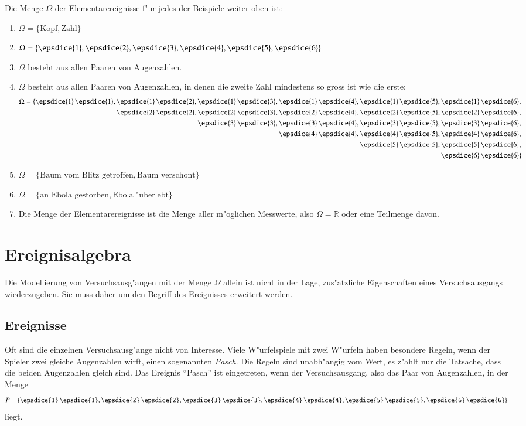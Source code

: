 Die Menge $\Omega$ der Elementarereignisse f"ur jedes der Beispiele weiter
oben ist:
\begin{enumerate}
\item $\Omega=\{\text{Kopf},\text{Zahl}\}$
\item $\Omega=\{\epsdice{1},
\epsdice{2},
\epsdice{3},
\epsdice{4},
\epsdice{5},
\epsdice{6}\}$
\item $\Omega$ besteht aus allen Paaren von Augenzahlen.
\item $\Omega$ besteht aus allen Paaren von Augenzahlen, in denen die
zweite Zahl mindestens so gross ist wie die erste:
{
\def\e#1#2{\epsdice{#1}\,\epsdice{#2}}
\def\p{\phantom{\epsdice{1}\,\epsdice{1},\,}}
\begin{align*}
\Omega=\{
           &\e{1}{1},\e{1}{2},\e{1}{3},\e{1}{4},\e{1}{5},\e{1}{6},\\
           &\p       \e{2}{2},\e{2}{3},\e{2}{4},\e{2}{5},\e{2}{6},\\
           &\p       \p       \e{3}{3},\e{3}{4},\e{3}{5},\e{3}{6},\\
           &\p       \p       \p       \e{4}{4},\e{4}{5},\e{4}{6},\\
           &\p       \p       \p       \p       \e{5}{5},\e{5}{6},\\
           &\p       \p       \p       \p       \p       \e{6}{6}
\}
\end{align*}
}
\item $\Omega=\{\text{Baum vom Blitz getroffen},\text{Baum verschont}\}$
\item $\Omega=\{\text{an Ebola gestorben},\text{Ebola "uberlebt}\}$
\item Die Menge der Elementarereignisse ist die Menge aller m"oglichen
Messwerte, also $\Omega=\mathbb{R}$ oder eine Teilmenge davon.
\end{enumerate}

\section{Ereignisalgebra} \label{section-ereignisse}
Die Modellierung von Versuchsausg"angen mit der Menge $\Omega$
allein ist nicht in der Lage, zus"atzliche Eigenschaften eines
Versuchsausgangs wiederzugeben.
Sie muss daher um den Begriff des Ereignisses erweitert werden.

\subsection{Ereignisse}
Oft sind die einzelnen Versuchsausg"ange nicht von Interesse.
Viele W"urfelspiele mit zwei W"urfeln haben besondere Regeln, wenn
der Spieler zwei gleiche Augenzahlen wirft, einen sogenannten {\em Pasch}.
Die Regeln sind unabh"angig vom Wert, es z"ahlt nur die Tatsache,
dass die beiden Augenzahlen gleich sind.
Das Ereignis ``Pasch'' ist eingetreten, wenn der Versuchsausgang, also das
Paar von Augenzahlen, in der Menge
\[
\def\e#1{\epsdice{#1}\,\epsdice{#1}}
P=\{
\e{1},
\e{2},
\e{3},
\e{4},
\e{5},
\e{6}
\}
\]
liegt.

